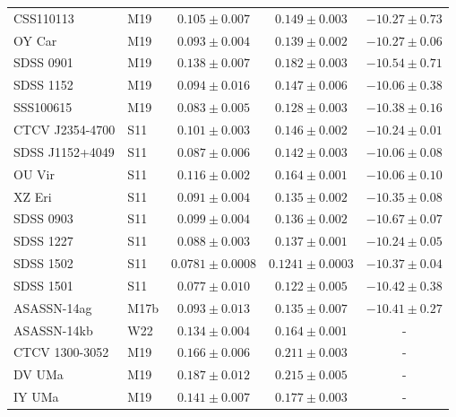 \begin{table}
\begin{tabular}{llccc}
        CSS110113        & M19  &  $0.105 \pm 0.007$    & $0.149 \pm 0.003$     & $ -10.27 \pm 0.73$    \\
        OY Car           & M19  &  $0.093 \pm 0.004$    & $0.139 \pm 0.002$     & $ -10.27 \pm 0.06$    \\
        SDSS 0901        & M19  &  $0.138 \pm 0.007$    & $0.182 \pm 0.003$     & $ -10.54 \pm 0.71$    \\
        SDSS 1152        & M19  &  $0.094 \pm 0.016$    & $0.147 \pm 0.006$     & $ -10.06 \pm 0.38$    \\
        SSS100615        & M19  &  $0.083 \pm 0.005$    & $0.128 \pm 0.003$     & $ -10.38 \pm 0.16$    \\
        CTCV J2354-4700  & S11  &  $0.101 \pm 0.003$    & $0.146 \pm 0.002$     & $ -10.24 \pm 0.01$    \\
        SDSS J1152+4049  & S11  &  $0.087 \pm 0.006$    & $0.142 \pm 0.003$     & $ -10.06 \pm 0.08$    \\
        OU Vir           & S11  &  $0.116 \pm 0.002$    & $0.164 \pm 0.001$     & $ -10.06 \pm 0.10$    \\
        XZ Eri           & S11  &  $0.091 \pm 0.004$    & $0.135 \pm 0.002$     & $ -10.35 \pm 0.08$    \\
        SDSS 0903        & S11  &  $0.099 \pm 0.004$    & $0.136 \pm 0.002$     & $ -10.67 \pm 0.07$    \\
        SDSS 1227        & S11  &  $0.088 \pm 0.003$    & $0.137 \pm 0.001$     & $ -10.24 \pm 0.05$    \\
        SDSS 1502        & S11  &  $0.0781 \pm 0.0008$  & $0.1241 \pm 0.0003$   & $ -10.37 \pm 0.04$    \\
        SDSS 1501        & S11  &  $0.077 \pm 0.010$    & $0.122 \pm 0.005$     & $ -10.42 \pm 0.38$    \\
        ASASSN-14ag      & M17b &  $0.093 \pm 0.013$    & $0.135 \pm 0.007$     & $ -10.41 \pm 0.27$    \\
        ASASSN-14kb      & W22  &  $0.134 \pm 0.004$    & $0.164 \pm 0.001$     & -                     \\
        CTCV 1300-3052   & M19  &  $0.166 \pm 0.006$    & $0.211 \pm 0.003$     & -                     \\
        DV UMa           & M19  &  $0.187 \pm 0.012$    & $0.215 \pm 0.005$     & -                     \\
        IY UMa           & M19  &  $0.141 \pm 0.007$    & $0.177 \pm 0.003$     & -                     \\

\end{tabular}
\end{table}
